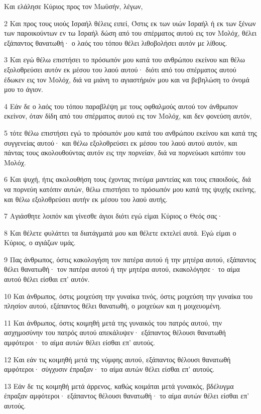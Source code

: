 \par Και ελάλησε Κύριος προς τον Μωϋσήν, λέγων,
\par 2 Και προς τους υιούς Ισραήλ θέλεις ειπεί, Όστις εκ των υιών Ισραήλ ή εκ των ξένων των παροικούντων εν τω Ισραήλ δώση από του σπέρματος αυτού εις τον Μολόχ, θέλει εξάπαντος θανατωθή· ο λαός του τόπου θέλει λιθοβολήσει αυτόν με λίθους.
\par 3 Και εγώ θέλω επιστήσει το πρόσωπόν μου κατά του ανθρώπου εκείνου και θέλω εξολοθρεύσει αυτόν εκ μέσου του λαού αυτού· διότι από του σπέρματος αυτού έδωκεν εις τον Μολόχ, διά να μιάνη το αγιαστήριόν μου και να βεβηλώση το όνομά μου το άγιον.
\par 4 Εάν δε ο λαός του τόπου παραβλέψη με τους οφθαλμούς αυτού τον άνθρωπον εκείνον, όταν δίδη από του σπέρματος αυτού εις τον Μολόχ, και δεν φονεύση αυτόν,
\par 5 τότε θέλω επιστήσει εγώ το πρόσωπόν μου κατά του ανθρώπου εκείνου και κατά της συγγενείας αυτού· και θέλω εξολοθρεύσει εκ μέσου του λαού αυτού αυτόν, και πάντας τους ακολουθούντας αυτόν εις την πορνείαν, διά να πορνεύωσι κατόπιν του Μολόχ.
\par 6 Και ψυχή, ήτις ακολουθήση τους έχοντας πνεύμα μαντείας και τους επαοιδούς, διά να πορνεύη κατόπιν αυτών, θέλω επιστήσει το πρόσωπόν μου κατά της ψυχής εκείνης, και θέλω εξολοθρεύσει αυτήν εκ μέσου του λαού αυτής.
\par 7 Αγιάσθητε λοιπόν και γίνεσθε άγιοι διότι εγώ είμαι Κύριος ο Θεός σας·
\par 8 Και θέλετε φυλάττει τα διατάγματά μου και θέλετε εκτελεί αυτά. Εγώ είμαι ο Κύριος, ο αγιάζων υμάς.
\par 9 Πας άνθρωπος, όστις κακολογήση τον πατέρα αυτού ή την μητέρα αυτού, εξάπαντος θέλει θανατωθή· τον πατέρα αυτού ή την μητέρα αυτού, εκακολόγησε· το αίμα αυτού θέλει είσθαι επ' αυτόν.
\par 10 Και άνθρωπος, όστις μοιχεύση την γυναίκα τινός, όστις μοιχεύση την γυναίκα του πλησίον αυτού, εξάπαντος θέλει θανατωθή, ο μοιχεύων και η μοιχευομένη.
\par 11 Και άνθρωπος, όστις κοιμηθή μετά της γυναικός του πατρός αυτού, την ασχημοσύνην του πατρός αυτού απεκάλυψεν· εξάπαντος θέλουσι θανατωθή αμφότεροι· το αίμα αυτών θέλει είσθαι επ' αυτούς.
\par 12 Και εάν τις κοιμηθή μετά της νύμφης αυτού, εξάπαντος θέλουσι θανατωθή αμφότεροι· σύγχυσιν έπραξαν· το αίμα αυτών θέλει είσθαι επ' αυτούς.
\par 13 Εάν δε τις κοιμηθή μετά άρρενος, καθώς κοιμάται μετά γυναικός, βδέλυγμα έπραξαν αμφότεροι· εξάπαντος θέλουσι θανατωθή· το αίμα αυτών θέλει είσθαι επ' αυτούς.
